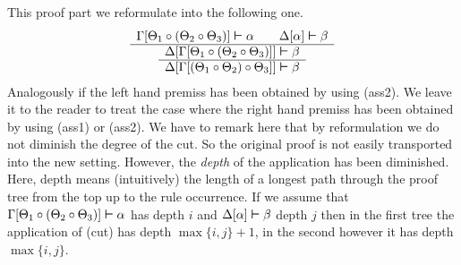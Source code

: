 This proof part we reformulate into the following one.
\begin{equation}
\begin{array}{c}
\Gamma[\Theta_1 \circ (\Theta_2 \circ \Theta_3)] \boldsymbol{\vdash} \alpha
        \qquad \Delta[\alpha] \boldsymbol{\vdash} \beta \\\hline
\begin{array}{c}
\Delta[\Gamma[\Theta_1 \circ (\Theta_2 \circ \Theta_3)]] \boldsymbol{\vdash}
        \beta \\\hline
\Delta[\Gamma[(\Theta_1 \circ \Theta_2) \circ \Theta_3]] \boldsymbol{\vdash}
        \beta
\end{array}
\end{array}
\end{equation}
Analogously if the left hand premiss has been obtained by using
(ass2). We leave it to the reader to treat the case where the right
hand premiss has been obtained by using (ass1) or (ass2). We
have to remark here that by reformulation we do not diminish the
degree of the cut. So the original proof is not easily transported
into the new setting. However, the {\it depth\/} of the application
has been diminished. Here, depth means (intuitively) the length of
a longest path through the proof tree from the top up to the
rule occurrence. If we assume that $\Gamma[\Theta_1 \circ %
(\Theta_2 \circ \Theta_3)] \bvdash \alpha$ has depth $i$ and
$\Delta[\alpha] \boldsymbol{\vdash} \beta$ depth $j$ then in the first tree
the application of (cut) has depth $\max \{i,j\} + 1$,
in the second however it has depth $\max \{i,j\}$.

